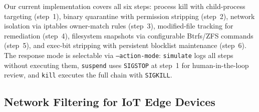 \documentclass[twocolumn, 10pt]{scrartcl}
\begin{document}
Our current implementation covers all six steps: process kill with child-process targeting (step~1), binary quarantine with permission stripping (step~2), network isolation via iptables owner-match rules (step~3), modified-file tracking for remediation (step~4), filesystem snapshots via configurable Btrfs/ZFS commands (step~5), and exec-bit stripping with persistent blocklist maintenance (step~6). The response mode is selectable via \texttt{--action-mode}: \texttt{simulate} logs all steps without executing them, \texttt{suspend} uses \texttt{SIGSTOP} at step~1 for human-in-the-loop review, and \texttt{kill} executes the full chain with \texttt{SIGKILL}.

\subsection{Network Filtering for IoT Edge Devices}

\end{document}
